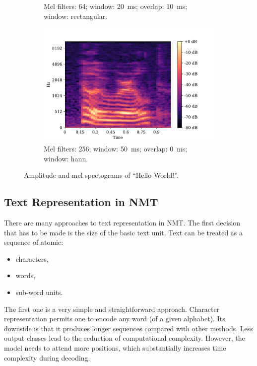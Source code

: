 \begin{figure}[h!b]
\begin{subfigure}[b]{.49\textwidth}
		\caption{Mel filters: 64; window: 20~ms; overlap: 10~ms; window: rectangular.}
		\label{fig:sfig3}
	\end{subfigure}
     \hfill
	\begin{subfigure}[b]{.49\textwidth}
	\centering
	\includegraphics[width=.8\linewidth]{img/mel}
	\caption{Mel filters: 256; window: 50~ms; overlap: 0~ms; window: hann.}
	\label{fig:sfig4}
\end{subfigure}
	\caption{Amplitude and mel spectograms of ``Hello World!''.}
	\label{fig:mel}
\end{figure}

\clearpage

\subsection{Text Representation in NMT}
\label{intro:text_repre}

There are many approaches to text representation in NMT. The first decision that has to be made is the size of the basic text unit. Text can be treated as a sequence of atomic:

\begin{itemize}
	\item characters,
	\item words,
	\item sub-word units.
\end{itemize}

The first one is a very simple and straightforward approach. Character representation permits one to encode any word (of a given alphabet). Its downside is that it produces longer sequences compared with other methods. Less output classes lead to the reduction of computational complexity. However, the model needs to attend more positions, which substantially increases time complexity during decoding.

